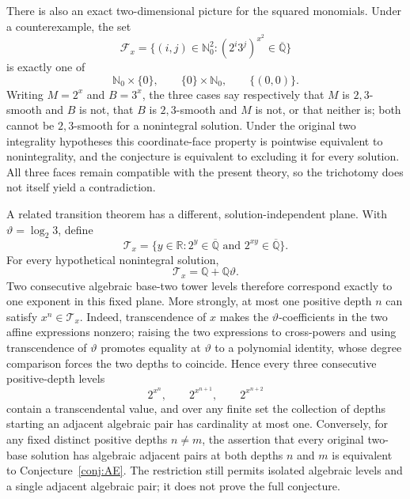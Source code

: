 \documentclass[11pt,oneside]{article}
\theoremstyle{definition}
\theoremstyle{remark}
\newcommand{\Nzero}{\mathbb N_0}
\newcommand{\Q}{\mathbb Q}
\newcommand{\R}{\mathbb R}
\newcommand{\Abar}{\overline{\mathbb Q}}
\newcommand{\thetaq}{\vartheta}
\newcommand{\Qbar}{\Abar}
\begin{document}
There is also an exact two-dimensional picture for the squared monomials.  Under a
counterexample, the set
\[
 \mathcal F_x=\{(i,j)\in\Nzero^2:
      (2^i3^j)^{x^2}\in\Qbar\}
\]
is exactly one of
\[
 \Nzero\times\{0\},\qquad \{0\}\times\Nzero,\qquad \{(0,0)\}.
\]
Writing $M=2^x$ and $B=3^x$, the three cases say respectively that $M$ is $2,3$-smooth and
$B$ is not, that $B$ is $2,3$-smooth and $M$ is not, or that neither is; both cannot be
$2,3$-smooth for a nonintegral solution.  Under the original two integrality hypotheses this
coordinate-face property is pointwise equivalent to nonintegrality, and the conjecture is
equivalent to excluding it for every solution.  All three faces remain compatible with the
present theory, so the trichotomy does not itself yield a contradiction.

A related transition theorem has a different, solution-independent plane.  With
$\thetaq=\log_2 3$, define
\[
 \mathcal T_x=\{y\in\R:2^y\in\Qbar\text{ and }2^{xy}\in\Qbar\}.
\]
For every hypothetical nonintegral solution,
\begin{equation}
 \mathcal T_x=\Q+\Q\thetaq.
 \label{sp:eq-tower-transition}
\end{equation}
Two consecutive algebraic base-two tower levels therefore correspond exactly to one exponent
in this fixed plane.  More strongly, at most one positive depth $n$ can satisfy
$x^n\in\mathcal T_x$.  Indeed, transcendence of $x$ makes the $\thetaq$-coefficients in the
two affine expressions nonzero; raising the two expressions to cross-powers and using
transcendence of $\thetaq$ promotes equality at $\thetaq$ to a polynomial identity, whose
degree comparison forces the two depths to coincide.  Hence every three consecutive
positive-depth levels
\[
 2^{x^n},\qquad 2^{x^{n+1}},\qquad 2^{x^{n+2}}
\]
contain a transcendental value, and over any finite set the collection of depths starting an
adjacent algebraic pair has cardinality at most one.  Conversely, for any fixed distinct
positive depths $n\ne m$, the assertion that every original two-base solution has algebraic
adjacent pairs at both depths $n$ and $m$ is equivalent to Conjecture~\ref{conj:AE}.  The
restriction still permits isolated algebraic levels and a single adjacent algebraic pair; it
does not prove the full conjecture.
\end{document}
